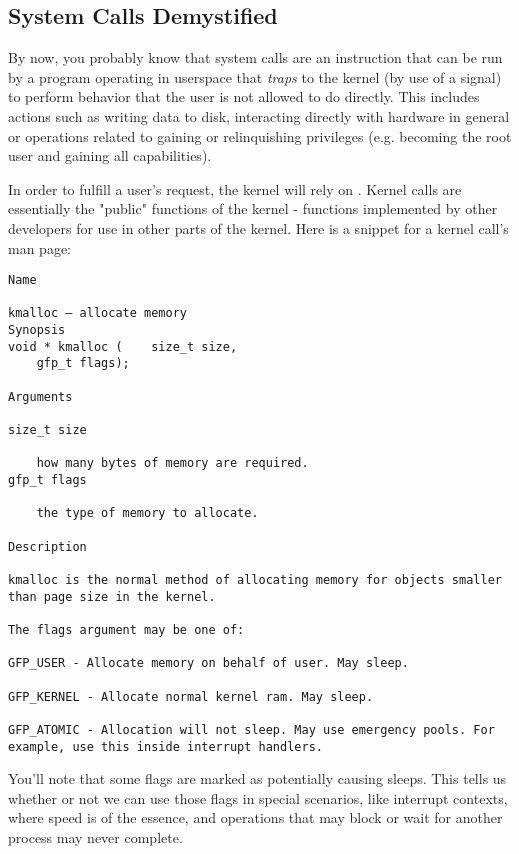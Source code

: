 \subsection{System Calls Demystified}

By now, you probably know that system calls are an instruction that can be run by a program operating in userspace that
\textit{traps} to the kernel (by use of a signal) to perform behavior that the user is not allowed to do directly. This
includes actions such as writing data to disk, interacting directly with hardware in general or operations related to
gaining or relinquishing privileges (e.g.  becoming the root user and gaining all capabilities).

In order to fulfill a user's request, the kernel will rely on . Kernel calls are essentially the
"public" functions of the kernel - functions implemented by other developers for use in other parts of the kernel. Here
is a snippet for a kernel call's man page:

\begin{lstlisting}
Name

kmalloc — allocate memory
Synopsis
void * kmalloc (	size_t size,
 	gfp_t flags);

Arguments

size_t size

    how many bytes of memory are required.
gfp_t flags

    the type of memory to allocate.

Description

kmalloc is the normal method of allocating memory for objects smaller than page size in the kernel.

The flags argument may be one of:

GFP_USER - Allocate memory on behalf of user. May sleep.

GFP_KERNEL - Allocate normal kernel ram. May sleep.

GFP_ATOMIC - Allocation will not sleep. May use emergency pools. For example, use this inside interrupt handlers.
\end{lstlisting}

You'll note that some flags are marked as potentially causing sleeps. This tells us whether or not we can use those
flags in special scenarios, like interrupt contexts, where speed is of the essence, and operations that may block or
wait for another process may never complete.


